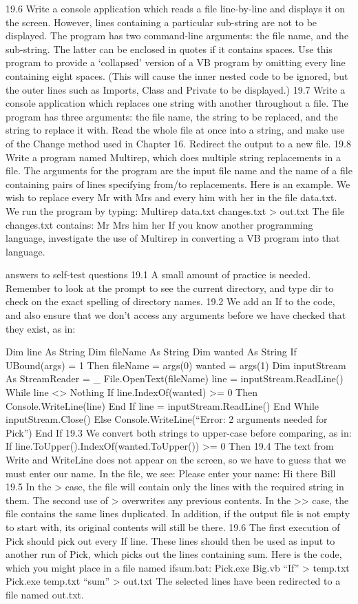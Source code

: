 19.6	Write a console application which reads a ﬁle line-by-line and displays it on the screen. However, lines containing a particular sub-string are not to be displayed. The program has two command-line arguments: the ﬁle name, and the sub-string. The latter can be enclosed in quotes if it contains spaces. Use this program to provide a ‘collapsed’ version of a VB program by omitting every line containing eight spaces. (This will cause the inner nested code to be ignored, but the outer lines such as Imports, Class and Private to be displayed.)
19.7	Write a console application which replaces one string with another throughout 
a ﬁle. The program has three arguments: the ﬁle name, the string to be replaced, and the string to replace it with. Read the whole ﬁle at once into a string, and 
make use of the Change method used in Chapter 16. Redirect the output to a 
new ﬁle.
19.8	Write a program named Multirep, which does multiple string replacements in a ﬁle. The arguments for the program are the input ﬁle name and the name of a ﬁle containing pairs of lines specifying from/to replacements. Here is an example. We wish to replace every Mr with Mrs and every him with her in the ﬁle data.txt. We run the program by typing:
Multirep data.txt changes.txt > out.txt
	The ﬁle changes.txt contains:
Mr
Mrs
him
her
	If you know another programming language, investigate the use of Multirep in converting a VB program into that language.

answers to self-test questions
19.1	A small amount of practice is needed. Remember to look at the prompt to see the current directory, and type dir to check on the exact spelling of directory names.
19.2	We add an If to the code, and also ensure that we don’t access any arguments before we have checked that they exist, as in:

Dim line As String
Dim fileName As String
Dim wanted As String	
If UBound(args) = 1 Then
		fileName = args(0)
		wanted = args(1)	
		Dim inputStream As StreamReader = _
					File.OpenText(fileName)
		line = inputStream.ReadLine()
		While line <> Nothing
			If line.IndexOf(wanted) >= 0 Then
				Console.WriteLine(line)
			End If
			line = inputStream.ReadLine()
		End While
		inputStream.Close()
Else
		Console.WriteLine(“Error: 2 arguments needed for Pick”)
End If
19.3	We convert both strings to upper-case before comparing, as in:
If line.ToUpper().IndexOf(wanted.ToUpper()) >= 0 Then
19.4	The text from Write and WriteLine does not appear on the screen, so we have to guess that we must enter our name. In the ﬁle, we see:
Please enter your name: Hi there Bill
19.5	In the > case, the ﬁle will contain only the lines with the required string in them. The second use of > overwrites any previous contents.
In the >> case, the ﬁle contains the same lines duplicated. In addition, if the output ﬁle is not empty to start with, its original contents will still be there.
19.6	The ﬁrst execution of Pick should pick out every If line. These lines should then be used as input to another run of Pick, which picks out the lines containing sum. Here is the code, which you might place in a ﬁle named ifsum.bat:
Pick.exe Big.vb “If” > temp.txt
Pick.exe temp.txt “sum” > out.txt
	The selected lines have been redirected to a ﬁle named out.txt.

